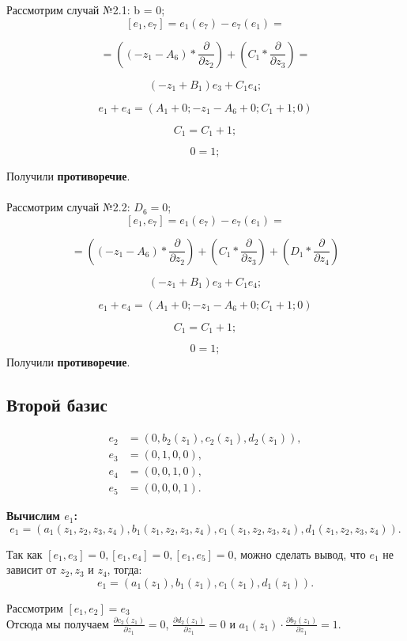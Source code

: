 \documentclass[12pt]{article}
\begin{document}
Рассмотрим случай №2.1: b = 0; \\

\[
[e_1, e_7] = e_1(e_7) - e_7(e_1) = 
\]

\[
= \left( (-z_1 - A_6) * \frac{\partial}{\partial z_2} \right)
+ \left( C_1 * \frac{\partial}{\partial z_3} \right) =
\]

\[
(-z_1 + B_1)e_3 + C_1e_4;
\]

\[
e_1 + e_4 = \left(A_1 + 0; -z_1 - A_6 + 0; C_1 + 1; 0 \right)
\]

\[
C_1 = C_1 + 1;
\]

\[
0 = 1;
\]

Получили \textbf{противоречие}.\\\\
Рассмотрим случай №2.2: $D_6 = 0$; \\

\[
[e_1, e_7] = e_1(e_7) - e_7(e_1) = 
\]

\[
= \left( (-z_1 - A_6) * \frac{\partial}{\partial z_2} \right)
+ \left( C_1 * \frac{\partial}{\partial z_3} \right)
+ \left( D_1 * \frac{\partial}{\partial z_4} \right)
\]

\[
(-z_1 + B_1)e_3 + C_1e_4;
\]

\[
e_1 + e_4 = \left(A_1 + 0; -z_1 - A_6 + 0; C_1 + 1; 0 \right)
\]

\[
C_1 = C_1 + 1;
\]

\[
0 = 1;
\]
Получили \textbf{противоречие}. 

\subsection{Второй базис} 
\begin{align*}
e_2 &= (0,b_2(z_1),c_2(z_1),d_2(z_1)), \\
e_3 &= (0,1,0,0), \\
e_4 &= (0,0,1,0), \\
e_5 &= (0,0,0,1). 
\end{align*}

\textbf{Вычислим $e_1$:}
$$e_1 = (a_1(z_1,z_2,z_3,z_4), b_1(z_1,z_2,z_3,z_4), c_1(z_1,z_2,z_3,z_4), d_1(z_1,z_2,z_3,z_4)).$$

Так как $[e_1,e_3] = 0, [e_1,e_4] = 0, [e_1,e_5] = 0$, можно сделать вывод, что $e_1$ не зависит от $z_2, z_3 \text{ и } z_4$, тогда: 
$$e_1 = (a_1(z_1), b_1(z_1), c_1(z_1), d_1(z_1)).$$ 

Рассмотрим $[e_1,e_2] = e_3$ \\

Отсюда мы получаем $\frac{\partial{c_2(z_1)}}{\partial{z_1}} = 0$, $\frac{\partial{d_2(z_1)}}{\partial{z_1}} = 0$ и $a_1(z_1) \cdot \frac{\partial{b_2(z_1)}}{\partial{z_1}} = 1$. \\
\end{document}

